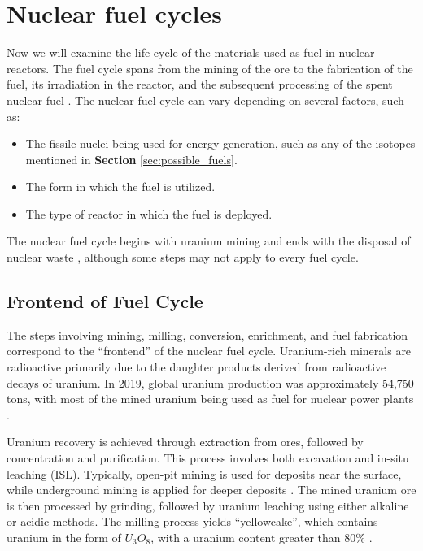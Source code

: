 \chapter{Nuclear fuel cycles}

Now we will examine the life cycle of the materials used as fuel in nuclear reactors. The fuel cycle spans from the mining of the ore to the fabrication of the fuel, its irradiation in the reactor, and the subsequent processing of the spent nuclear fuel \cite{fuel_cycle_book}. The nuclear fuel cycle can vary depending on several factors, such as:

\begin{itemize}
    \item The fissile nuclei being used for energy generation, such as any of the isotopes mentioned in \textbf{Section} \ref{sec:possible_fuels}.
    \item The form in which the fuel is utilized.
    \item The type of reactor in which the fuel is deployed.
\end{itemize}

The nuclear fuel cycle begins with uranium mining and ends with the disposal of nuclear waste \cite{fuel_cycle_book}, although some steps may not apply to every fuel cycle.

\section{Frontend of Fuel Cycle}

The steps involving mining, milling, conversion, enrichment, and fuel fabrication correspond to the ``frontend'' of the nuclear fuel cycle. Uranium-rich minerals are radioactive primarily due to the daughter products derived from radioactive decays of uranium. In 2019, global uranium production was approximately 54,750 tons, with most of the mined uranium being used as fuel for nuclear power plants \cite{fuel_cycle_book}.

Uranium recovery is achieved through extraction from ores, followed by concentration and purification. This process involves both excavation and in-situ leaching (ISL). Typically, open-pit mining is used for deposits near the surface, while underground mining is applied for deeper deposits \cite{fuel_cycle_book}. The mined uranium ore is then processed by grinding, followed by uranium leaching using either alkaline or acidic methods. The milling process yields ``yellowcake'', which contains uranium in the form of \(U_3O_8\), with a uranium content greater than \(80\%\) \cite{fuel_cycle_book}.

